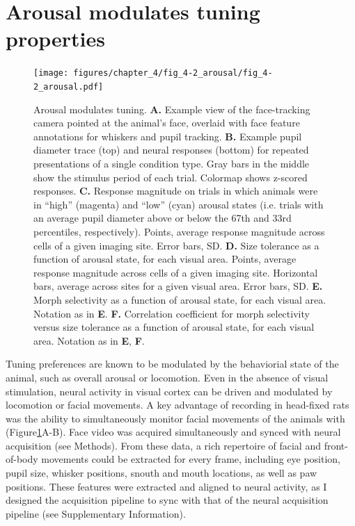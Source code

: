 \section{Arousal modulates tuning properties} 
\begin{figure}[t!]
    \texttt{[image: figures/chapter\_4/fig\_4-2\_arousal/fig\_4-2\_arousal.pdf]}
    \caption[Arousal modulates tuning]{Arousal modulates tuning. 
    \textbf{A.} Example view of the face-tracking camera pointed at the animal’s face, overlaid with face feature annotations for whiskers and pupil tracking.
    \textbf{B.} Example pupil diameter trace (top) and neural responses (bottom) for repeated presentations of a single condition type. Gray bars in the middle show the stimulus period of each trial. Colormap shows z-scored responses.
    \textbf{C.} Response magnitude on trials in which animals were in “high” (magenta) and “low” (cyan) arousal states (i.e. trials with an average pupil diameter above or below the 67th and 33rd percentiles, respectively). Points, average response magnitude across cells of a given imaging site. Error bars, SD.
    \textbf{D.} Size tolerance as a function of arousal state, for each visual area. Points, average response magnitude across cells of a given imaging site. Horizontal bars, average across sites for a given visual area. Error bars, SD.
    \textbf{E.} Morph selectivity as a function of arousal state, for each visual area. Notation as in \textbf{E}.
    \textbf{F.} Correlation coefficient for morph selectivity versus size tolerance as a function of arousal state, for each visual area. Notation as in \textbf{E}, \textbf{F}.
    \label{fig:arousal}}
\end{figure}

Tuning preferences are known to be modulated by the behaviorial state of the animal, such as overall arousal or locomotion\cite{Niell2010,Saleem2013,Vinck2015, Dadarlat2017}. Even in the absence of visual stimulation, neural activity in visual cortex can be driven and modulated by locomotion or facial movements\cite{Keller2012SensorimotorMouse, Stringer2019a}. A key advantage of recording in head-fixed rats was the ability to simultaneously monitor facial movements of the animals with (Figure\ref{fig:arousal}A-B). Face video was acquired simultaneously and synced with neural acquisition (see Methods). From these data, a rich repertoire of facial and front-of-body movements could be extracted for every frame, including eye position, pupil size, whisker positions, snouth and mouth locations, as well as paw positions. These features were extracted\cite{Mathis2018, Nath2019} and aligned to neural activity, as I designed the acquisition pipeline to sync with that of the neural acquisition pipeline (see Supplementary Information).

